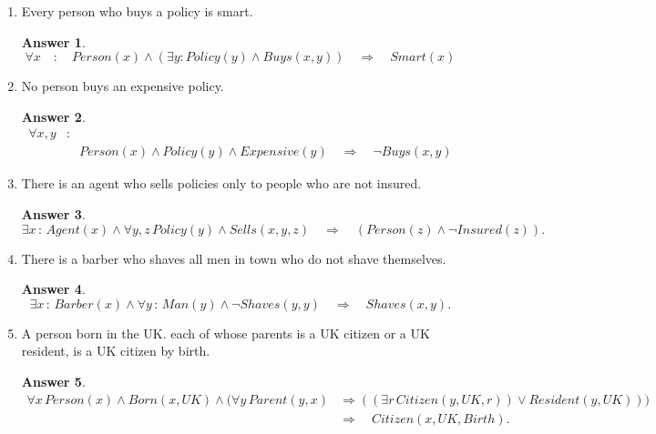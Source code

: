 \documentclass[a4paper]{article}
\renewcommand{\(}{\left(}
\renewcommand{\)}{\right)}
\theoremstyle{plain}
\theoremstyle{plain}
\theoremstyle{definition}
\newtheorem*{answer}{Answer}
\begin{document}
\begin{enumerate}[label*=\alph*.,ref=\alph*]
\item Every person who buys a policy is smart.
\begin{shaded}
\begin{answer}
\begin{equation*}
  \forall x \quad : \quad Person(x) \wedge (\exists y : Policy(y) \wedge Buys(x,y) ) \quad \Rightarrow \quad Smart(x)
\end{equation*}
\end{answer}
\end{shaded}

\item No person buys an expensive policy.
\begin{shaded}
\begin{answer}
\begin{align*}
  \forall x, y & : \\
   & \quad Person(x) \wedge Policy(y)  \wedge Expensive(y) \quad \Rightarrow \quad  \neg Buys(x, y)
\end{align*}
\end{answer}
\end{shaded}

\item There is an agent who sells policies only to people who are not insured.
\begin{shaded}
\begin{answer}
\begin{equation*}
 \exists x \, : \, Agent(x) \wedge \forall y, z \,  Policy(y) \wedge Sells(x, y, z) \quad \Rightarrow \quad (Person(z)\wedge \neg Insured(z)).
\end{equation*}
\end{answer}
\end{shaded}

\item There is a barber who shaves all men in town who do not shave themselves.
\begin{shaded}
\begin{answer}
\begin{equation*}
  \exists x \, : \, Barber(x) \wedge \forall y \, : \, Man(y) \wedge \neg Shaves(y, y) \quad \Rightarrow \quad Shaves(x, y).
\end{equation*}
\end{answer}
\end{shaded}

\item A person born in the UK. each of whose parents is a UK citizen or a UK resident, is a UK citizen by birth.
\begin{shaded}
\begin{answer}
\begin{align*}
  \forall x \, Person(x) \wedge Born(x,UK) \wedge (\forall y \, Parent(y, x)  &\Rightarrow  ((\exists r \, Citizen(y,UK, r)) \vee Resident(y,UK))) \\
  &\Rightarrow \quad Citizen(x,UK,Birth).
\end{align*}
\end{answer}
\end{shaded}


\end{enumerate}
\end{document}
